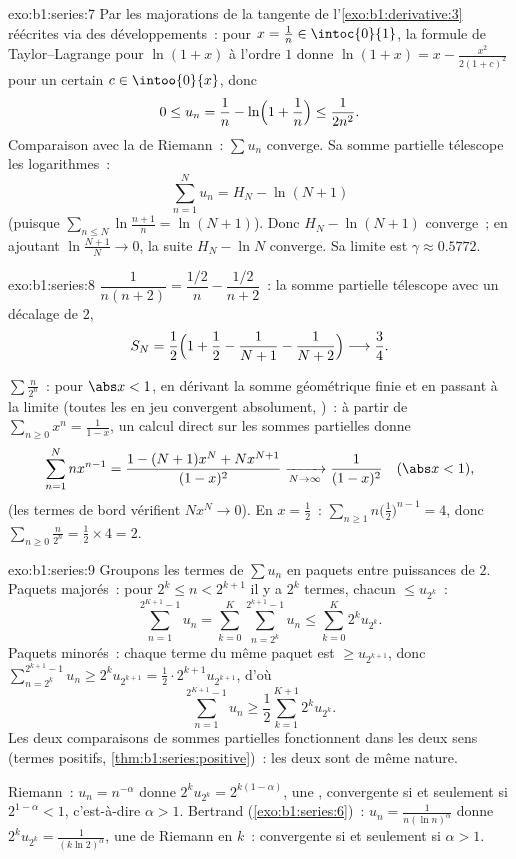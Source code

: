 \begin{solution}{exo:b1:series:7}
Par les majorations de la tangente de l'\cref{exo:b1:derivative:3}
réécrites via des développements~: pour $x = \frac1n \in
\intoc{0}{1}$, la formule de Taylor--Lagrange pour $\ln(1+x)$ à
l'ordre $1$ donne $\ln(1 + x) = x - \frac{x^2}{2(1 + c)^2}$ pour un
certain $c \in \intoo{0}{x}$, donc
\[
0 \leq u_n = \frac1n - \ln\Bigl(1 + \frac1n\Bigr) \leq
\frac{1}{2n^2} .
\]
Comparaison avec la  de Riemann~: $\sum u_n$ converge. Sa somme
partielle télescope les logarithmes~:
\[
\sum_{n=1}^{N} u_n = H_N - \ln(N+1)
\]
(puisque $\sum_{n\leq N} \ln\frac{n+1}{n} = \ln(N+1)$). Donc $H_N -
\ln(N+1)$ converge~; en ajoutant $\ln\frac{N+1}{N} \to 0$, la suite
$H_N - \ln N$ converge. Sa limite est $\gamma \approx 0.5772$.
\end{solution}

\begin{solution}{exo:b1:series:8}
$\dfrac{1}{n(n+2)} = \dfrac{1/2}{n} - \dfrac{1/2}{n+2}$~: la somme
partielle télescope avec un décalage de $2$,
\[
S_N = \frac12\Bigl(1 + \frac12 - \frac{1}{N+1} -
\frac{1}{N+2}\Bigr) \longrightarrow \frac34 .
\]

$\sum \frac{n}{2^n}$~: pour $\abs x < 1$, en dérivant la somme
géométrique finie et en passant à la limite (toutes les  en jeu
convergent absolument, )~: à partir de
$\sum_{n\geq0} x^n = \frac{1}{1-x}$, un calcul direct sur les sommes
partielles donne
\[
\sum_{n=1}^{N} n x^{n-1}
= \frac{1 - (N+1)x^N + N x^{N+1}}{(1 - x)^2}
\xrightarrow[N\to\infty]{} \frac{1}{(1-x)^2}
\quad (\abs x < 1),
\]
(les termes de bord vérifient $N x^N \to 0$). En $x = \frac12$~:
$\sum_{n\geq1} n\bigl(\frac12\bigr)^{n-1} = 4$, donc $\sum_{n\geq0}
\frac{n}{2^n} = \frac12 \times 4 = 2$.
\end{solution}

\begin{solution}{exo:b1:series:9}
Groupons les termes de $\sum u_n$ en paquets entre puissances de $2$.
Paquets majorés~: pour $2^k \leq n < 2^{k+1}$ il y a $2^k$ termes,
chacun $\leq u_{2^k}$~:
\[
\sum_{n=1}^{2^{K+1}-1} u_n
= \sum_{k=0}^{K} \sum_{n=2^k}^{2^{k+1}-1} u_n
\leq \sum_{k=0}^{K} 2^k u_{2^k} .
\]
Paquets minorés~: chaque terme du même paquet est $\geq u_{2^{k+1}}$,
donc $\sum_{n=2^k}^{2^{k+1}-1} u_n \geq 2^k u_{2^{k+1}} = \frac12
\cdot 2^{k+1} u_{2^{k+1}}$, d'où
\[
\sum_{n=1}^{2^{K+1}-1} u_n \geq \frac12 \sum_{k=1}^{K+1} 2^{k}
u_{2^{k}} .
\]
Les deux comparaisons de sommes partielles fonctionnent dans les deux
sens (termes positifs, \cref{thm:b1:series:positive})~: les deux
 sont de même nature.

Riemann~: $u_n = n^{-\alpha}$ donne $2^k u_{2^k} =
2^{k(1-\alpha)}$, une , convergente si et seulement
si $2^{1 - \alpha} < 1$, c'est-à-dire $\alpha > 1$. Bertrand
(\cref{exo:b1:series:6})~: $u_n = \frac{1}{n(\ln n)^\alpha}$ donne
$2^k u_{2^k} = \frac{1}{(k\ln 2)^\alpha}$, une  de Riemann en
$k$~: convergente si et seulement si $\alpha > 1$.
\end{solution}


